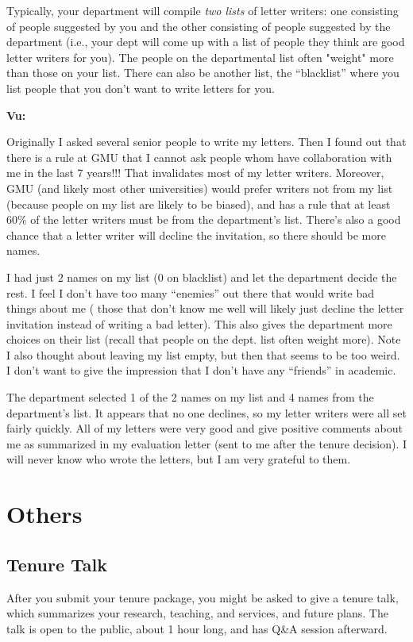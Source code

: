 \documentclass[oneside,11pt,dvipsnames]{book}
\newenvironment{commentbox}[1][]{
  \small
  \begin{mybox}
    {\small \textbf{#1}}
  }{
  \end{mybox}
}
\begin{document}
Typically, your department will compile \emph{two lists} of letter writers: one consisting of people suggested by you and the other consisting of people suggested by the department (i.e., your dept will come up with a list of people they think are good letter writers for you). The people on the departmental list often "weight" more than those on your list.
There can also be another list, the ``blacklist'' where you list people that you don't want to write letters for you.

\begin{commentbox}[Vu:]
Originally I asked several senior people to write my letters. Then I found out that there is a rule at GMU that I cannot ask people whom have collaboration with me in the last 7 years!!! That invalidates most of my letter writers.  Moreover, GMU (and likely most other universities) would prefer writers not from my list (because people on my list are likely to be biased), and has a rule that at least 60\% of the letter writers must be from the department's list. There's also a good chance that a letter writer will decline the invitation, so there should be more names.
\end{commentbox}

I had just 2 names on my list (0 on blacklist) and let the department decide the rest. I feel I don't have too many ``enemies'' out there that would write bad things about me ( those that don't know me well will likely just decline the letter invitation instead of writing a bad letter).  This also gives the department more choices on their list (recall that people on the dept. list often weight more).
Note I also thought about leaving my list empty, but then that seems to be too weird. I don't want to give the impression that I don't have any ``friends'' in academic. 

The department selected 1 of the 2 names on my list and 4 names from the department's list. It appears that no one declines, so my letter writers were all set fairly quickly. All of my letters were very good and give positive comments about me as summarized in my evaluation letter (sent to me after the tenure decision).  I will never know who wrote the letters, but I am very grateful to them.

\section{Others}
\subsection{Tenure Talk}
After you submit your tenure package, you might be asked to give a tenure talk, which summarizes your research, teaching, and services, and future plans.  The talk is open to the public, about 1 hour long, and has Q\&A session afterward.
\end{document}
